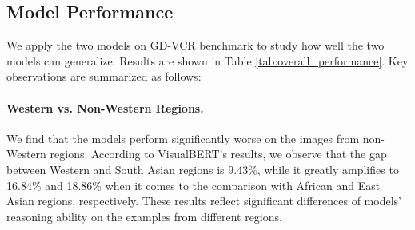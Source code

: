 \documentclass[11pt]{article}
\begin{document}
\begin{table*}[t]
    \centering
    \caption{Accuracy (\%) on the subset of each region in GD-VCR and the original VCR development set. With regard to Western regions, two models' performance gap of the original VCR development set and other regions is shown. We also report human's accuracy (\%) over each region subset. Annotators are from United Kingdom and United States according to MTurk.  denotes the reported result in~\citet{zellers2019vcr}.}
    \label{tab:overall_performance}
\end{table*}

\subsection{Model Performance}
\label{sec:model_performance}
We apply the two models on GD-VCR benchmark to study how well the two models can generalize. Results are shown in Table \ref{tab:overall_performance}. Key observations are summarized as follows:

\paragraph{Western vs. Non-Western Regions.} We find that the models perform significantly worse on the images from non-Western regions. According to VisualBERT's results, we observe that the gap between Western and South Asian regions is 9.43\%, while it greatly amplifies to 16.84\% and 18.86\% when it comes to the comparison with African and East Asian regions, respectively. These results reflect significant differences of models' reasoning ability on the examples from different regions. 
\end{document}
